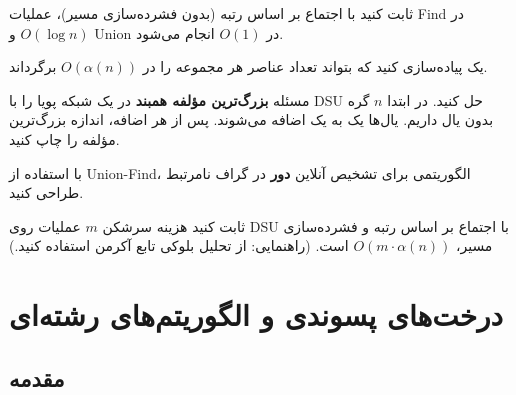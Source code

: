 \documentclass{matinbook}
\begin{document}
    \begin{exercise}
        ثابت کنید با اجتماع بر اساس رتبه
        (بدون فشرده‌سازی مسیر)،
        عملیات Find در $O(\log n)$
        و Union در $O(1)$ انجام می‌شود.
        \label{exc:union-rank-log}
    \end{exercise}
    
    \begin{exercise}
        یک  پیاده‌سازی کنید
        که بتواند تعداد عناصر هر مجموعه را
        در $O(\alpha(n))$ برگرداند.
        \label{exc:dsu-size}
    \end{exercise}
    
    \begin{exercise}
        مسئله \textbf{بزرگ‌ترین مؤلفه همبند}
        در یک شبکه پویا را با DSU حل کنید.
        در ابتدا $n$ گره بدون یال داریم.
        یال‌ها یک به یک اضافه می‌شوند.
        پس از هر اضافه، اندازه بزرگ‌ترین
        مؤلفه را چاپ کنید.
        \label{exc:largest-component}
    \end{exercise}
    
    \begin{exercise}
        با استفاده از Union-Find،
        الگوریتمی برای تشخیص آنلاین
        \textbf{دور} در گراف نامرتبط
        طراحی کنید.
        \label{exc:cycle-detection}
    \end{exercise}
    
    \begin{exercise}
        ثابت کنید هزینه سرشکن $m$ عملیات
        روی DSU با اجتماع بر اساس رتبه
        و فشرده‌سازی مسیر،
        $O(m \cdot \alpha(n))$ است.
        (راهنمایی: از تحلیل بلوکی
        تابع آکرمن استفاده کنید.)
        \label{exc:tarjan-proof}
    \end{exercise}
    
    
    
    \chapter{درخت‌های پسوندی و الگوریتم‌های رشته‌ای}
    \label{chap:string-algorithms}
    
    \section{مقدمه}
    
\end{document}
